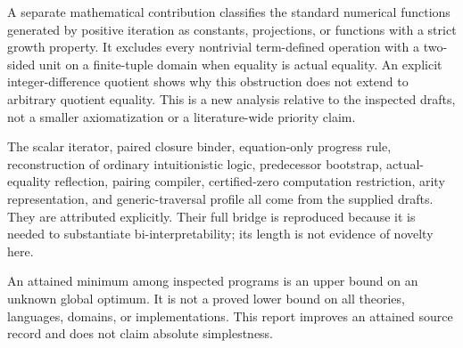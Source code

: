 A separate mathematical contribution classifies the standard numerical
functions generated by positive iteration as constants, projections, or
functions with a strict growth property. It excludes every nontrivial
term-defined operation with a two-sided unit on a finite-tuple domain
when equality is actual equality. An explicit integer-difference quotient
shows why this obstruction does not extend to arbitrary quotient equality.
This is a new analysis relative to the inspected drafts, not a smaller
axiomatization or a literature-wide priority claim.

The scalar iterator, paired closure binder, equation-only progress rule,
reconstruction of ordinary intuitionistic logic, predecessor bootstrap,
actual-equality reflection, pairing compiler, certified-zero computation
restriction, arity representation, and generic-traversal profile all
come from the supplied drafts. They are attributed explicitly. Their
full bridge is reproduced because it is needed to substantiate
bi-interpretability; its length is not evidence of novelty here.

An attained minimum among inspected programs is an upper bound on an
unknown global optimum. It is not a proved lower bound on all theories,
languages, domains, or implementations. This report improves an attained
source record and does not claim absolute simplestness.
